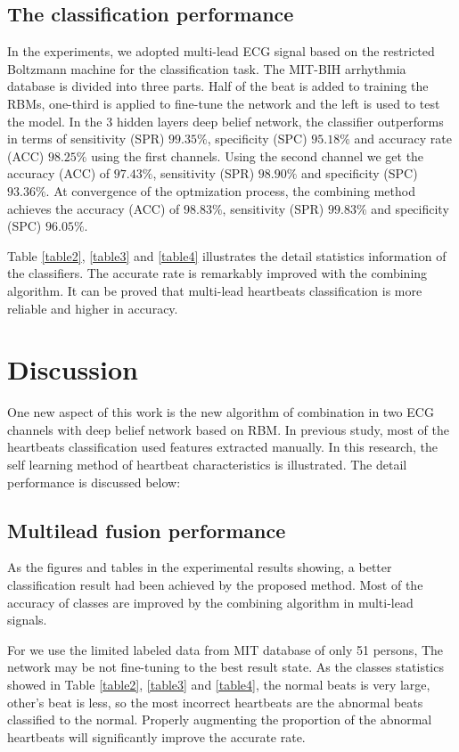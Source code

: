 \documentclass[conference]{IEEEtran}
\begin{document}
\subsection{The classification performance}

In the experiments, we adopted multi-lead ECG signal based on the restricted Boltzmann machine for the classification task. The MIT-BIH arrhythmia database is divided into three parts. Half of the beat is added to training the RBMs, one-third is applied to fine-tune the network and the left is used to test the model. In the 3 hidden layers deep belief network, the classifier outperforms in terms of sensitivity (SPR) $99.35\%$, specificity (SPC) $95.18\%$ and accuracy rate (ACC) $98.25\%$ using the first channels. Using the second channel we get the accuracy (ACC) of $97.43\%$, sensitivity (SPR) $98.90\%$ and specificity (SPC) $93.36\%$. At convergence of the optmization process, the combining method achieves the accuracy (ACC) of $98.83\%$, sensitivity (SPR) $99.83\%$ and specificity (SPC) $96.05\%$.

Table \ref{table2}, \ref{table3} and \ref{table4} illustrates the detail statistics information of the classifiers. The accurate rate is remarkably improved with the combining algorithm. It can be proved that multi-lead heartbeats classification is more reliable and higher in accuracy.

\section{Discussion}
One new aspect of this work is the new algorithm of combination in two ECG channels with deep belief network based on RBM. In previous study, most of the heartbeats classification used features extracted manually. In this research, the self learning method of heartbeat characteristics is illustrated. The detail performance is discussed below:

\subsection{Multilead fusion performance}
As the figures and tables in the experimental results showing, a better classification result had been achieved by the proposed method. Most of the accuracy of classes are improved by the combining algorithm in multi-lead signals.

For we use the limited labeled data from MIT database of only 51 persons, The network may be not fine-tuning to the best result state. As the classes statistics showed in Table \ref{table2}, \ref{table3} and \ref{table4}, the normal beats is very large, other's beat is less, so the most incorrect heartbeats are the abnormal beats classified to the normal. Properly augmenting the proportion of the abnormal heartbeats will significantly improve the accurate rate.
\end{document}
